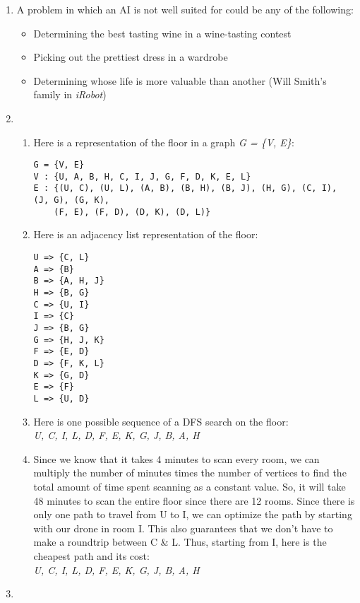 \documentclass{article}
\begin{document}
\begin{enumerate}
\begin{enumerate}
    \end{enumerate}
    \item %
    A problem in which an AI is not well suited for could be any of the following:
    \begin{itemize}
        \item
        Determining the best tasting wine in a wine-tasting contest
        \item
        Picking out the prettiest dress in a wardrobe
        \item
        Determining whose life is more valuable than another (Will Smith's family in \textit{iRobot})
    \end{itemize}
    \item %
        \begin{enumerate}
            \item
            \lstset{language=python}
            Here is a representation of the floor in a graph \textit{G = \{V, E\}}:
            \begin{lstlisting}[frame=single]
G = {V, E}
V : {U, A, B, H, C, I, J, G, F, D, K, E, L}
E : {(U, C), (U, L), (A, B), (B, H), (B, J), (H, G), (C, I), (J, G), (G, K),
    (F, E), (F, D), (D, K), (D, L)}
            \end{lstlisting}
            \item
            Here is an adjacency list representation of the floor:
            \begin{lstlisting}
U => {C, L}
A => {B}
B => {A, H, J}
H => {B, G}
C => {U, I}
I => {C}
J => {B, G}
G => {H, J, K}
F => {E, D}
D => {F, K, L}
K => {G, D}
E => {F}
L => {U, D}
            \end{lstlisting}
            \item
            Here is one possible sequence of a DFS search on the floor:
            \\\textit{U, C, I, L, D, F, E, K, G, J, B, A, H}
            \item
            Since we know that it takes 4 minutes to scan every room, we can multiply
            the number of minutes times the number of vertices to find the total amount of time
            spent scanning as a constant value. So, it will take 48 minutes to scan the entire
            floor since there are 12 rooms. Since there is only one path to travel from U to I, we can optimize
            the path by starting with our drone in room I. This also guarantees that we don't have to make a roundtrip between C \& L. Thus, starting from I, here is the cheapest path and its cost:
            \\\textit{U, C, I, L, D, F, E, K, G, J, B, A, H}


        \end{enumerate}
    \item %
\end{enumerate}
\end{document}
